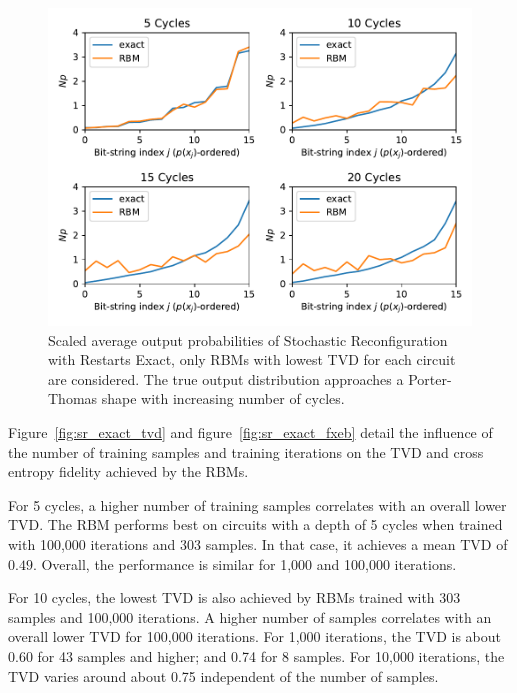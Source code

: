 \begin{figure}[H]
  \centering
  \includegraphics[width=\textwidth]{figures/results/SR-restarts-not-learned/avgBestPDF.pdf}
  \caption[Averaged best performing scaled output probabilities of Stochastic Reconfiguration with Restarts Exact]{
    Scaled average output probabilities of Stochastic Reconfiguration with Restarts Exact, only RBMs with lowest
    TVD for each circuit are considered. The true 
    output distribution approaches a Porter-Thomas shape with increasing number of cycles.}
  \label{fig:sr_exact_bestPDF}
\end{figure}

Figure~\ref{fig:sr_exact_tvd} and figure~\ref{fig:sr_exact_fxeb} detail the influence of the 
number of training samples and training iterations on the TVD and cross entropy fidelity achieved by 
the RBMs. 

For 5 cycles, a higher number of training samples 
correlates with an overall lower TVD. The RBM performs best on 
circuits with a depth of 5 cycles when trained with 100,000 iterations and 303 samples. In that case, 
it achieves a mean TVD of $0.49$. Overall, the performance is similar for 1,000 and 100,000 iterations.

For 10 cycles, the lowest TVD is also achieved by RBMs trained with 303 samples and 100,000 iterations.
A higher number of samples correlates with an overall lower TVD for 100,000 iterations. For 1,000 iterations, 
the TVD is about 0.60 for 43 samples and higher; and 0.74 for 8 samples. For 10,000 iterations, the TVD varies 
around about 0.75 independent of the number of samples. 

